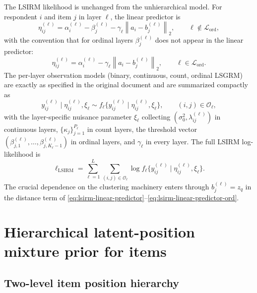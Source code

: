 \documentclass[11pt]{article}
\newcommand{\norm}[1]{\left\lVert #1 \right\rVert}
\begin{document}
The LSIRM likelihood is unchanged from the unhierarchical model.  For
respondent $i$ and item $j$ in layer $\ell$, the linear predictor is
\begin{equation}
    \eta_{ij}^{(\ell)}
    =
    \alpha_i^{(\ell)}-\beta_j^{(\ell)}-\gamma_\ell\norm{a_i-b_j^{(\ell)}}_2,
    \qquad \ell\notin\mathcal L_{\mathrm{ord}},
    \label{eq:lsirm-linear-predictor}
\end{equation}
with the convention that for ordinal layers $\beta_j^{(\ell)}$ does not appear
in the linear predictor:
\begin{equation}
    \eta_{ij}^{(\ell)}
    =
    \alpha_i^{(\ell)}-\gamma_\ell\norm{a_i-b_j^{(\ell)}}_2,
    \qquad \ell\in\mathcal L_{\mathrm{ord}}.
    \label{eq:lsirm-linear-predictor-ord}
\end{equation}
The per-layer observation models (binary, continuous, count, ordinal LSGRM)
are exactly as specified in the original document and are summarized
compactly as
\begin{equation}
    y_{ij}^{(\ell)}\mid \eta_{ij}^{(\ell)},\xi_\ell
    \sim f_\ell\bigl\{y_{ij}^{(\ell)}\mid \eta_{ij}^{(\ell)},\xi_\ell\bigr\},
    \qquad (i,j)\in\mathcal O_\ell,
    \label{eq:generic-layer-likelihood}
\end{equation}
with the layer-specific nuisance parameter $\xi_\ell$ collecting
$(\sigma_0^2,\lambda_{ij}^{(\ell)})$ in continuous layers,
$\{\kappa_j\}_{j=1}^{P_\ell}$ in count layers, the threshold vector
$(\beta_{j,1}^{(\ell)},\dots,\beta_{j,K_\ell-1}^{(\ell)})$ in ordinal layers,
and $\gamma_\ell$ in every layer.  The full LSIRM log-likelihood is
\begin{equation}
    \ell_{\mathrm{LSIRM}}
    =
    \sum_{\ell=1}^L
    \sum_{(i,j)\in\mathcal O_\ell}
    \log f_\ell\bigl\{y_{ij}^{(\ell)}\mid \eta_{ij}^{(\ell)},\xi_\ell\bigr\}.
    \label{eq:lsirm-loglik}
\end{equation}
The crucial dependence on the clustering machinery enters through
$b_j^{(\ell)}=z_q$ in the distance term of
\eqref{eq:lsirm-linear-predictor}--\eqref{eq:lsirm-linear-predictor-ord}.

\section{Hierarchical latent-position mixture prior for items}

\subsection{Two-level item position hierarchy}
\end{document}
